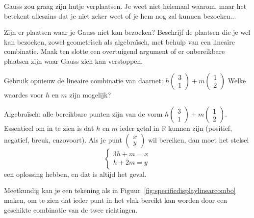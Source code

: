\documentclass{ximera}
\begin{document}
\begin{exercise}
Gauss zou graag zijn hutje verplaatsen.
Je weet niet helemaal waarom, maar het betekent alleszins dat je niet zeker weet of je hem nog zal kunnen bezoeken...\newline

Zijn er plaatsen waar je Gauss niet kan bezoeken?
Beschrijf de plaatsen die je wel kan bezoeken, zowel geometrisch als algebraïsch, met behulp van een lineaire combinatie.
Maak ten slotte een overtuigend argument of er onbereikbare plaatsen zijn waar Gauss zich kan verstoppen.
\begin{hint}
    Gebruik opnieuw de lineaire combinatie van daarnet: \(h \begin{pmatrix} 3 \\ 1 \end{pmatrix} + m \begin{pmatrix} 1 \\ 2 \end{pmatrix}\)
    Welke waardes voor \(h\) en \(m\) zijn mogelijk?
\end{hint}
\begin{oplossing}
    Algebraïsch: alle bereikbare punten zijn van de vorm \(h \begin{pmatrix} 3 \\ 1 \end{pmatrix} + m \begin{pmatrix} 1 \\ 2 \end{pmatrix}\).
    Essentieel om in te zien is dat \(h\) en \(m\) ieder getal in \(\mathbb{R}\) kunnen zijn (positief, negatief, breuk, enzovoort).
    Als je punt \(\begin{pmatrix} x \\ y \end{pmatrix}\) wil bereiken, dan moet het stelsel
    \[
    \left\{
        \begin{array}{l}
        3h+m=x\\
        h+2m=y
        \end{array}
    \right.
    \]
    een oplossing hebben, en dat is altijd het geval.\newline

    Meetkundig kan je een tekening als in Figuur~\ref{fig:specificdisplaylinearcombo} maken, om te zien dat ieder punt in het vlak bereikt kan worden door een geschikte combinatie van de twee richtingen.
    \begin{figure}[H]
    \centering
    \begin{tikzpicture}[scale=0.7]


\end{tikzpicture}
\end{figure}
\end{oplossing}
\end{exercise}
\end{document}
